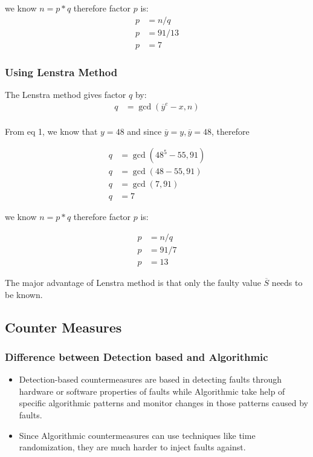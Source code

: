 \documentclass[1p,16pt]{elsarticle}
\begin{document}
we know $n = p * q$ therefore factor $p$ is:
\begin{align}
	p &= n / q \\
	p &= 91 / 13 \\
	p &= 7
\end{align}


\subsubsection{Using Lenstra Method}%
\label{sub:lenstra_method}
The Lenstra method gives factor $q$ by:
\begin{align}
	q &= \gcd(\overline{y}^e - x, n) \\
\end{align}

From eq 1, we know that $y=48$ and since
$\overline{y} = y, \overline{y} = 48$, therefore

\begin{align}
	q &= \gcd(48^5 - 55, 91) \\
	q &= \gcd(48 - 55, 91) \\
	q &= \gcd(7, 91) \\
	q &= 7
\end{align}

we know $n = p * q$ therefore factor $p$ is:

\begin{align}
	p &= n / q \\
	p &= 91 / 7 \\
	p &= 13
\end{align}

The major advantage of Lenstra method is that only the faulty value $\overline{S}$ needs to be known.



\subsection{Counter Measures}%
\label{sub:counter_measures}

\subsubsection{Difference between Detection based and Algorithmic}%
\label{sub:difference_between_detection_based_and_algorithmic}
\begin{itemize}
	\item Detection-based countermeasures are based in detecting faults through hardware or software properties
		of faults while Algorithmic take help of specific algorithmic patterns and monitor changes in those
		patterns caused by faults.
	\item Since Algorithmic countermeasures can use techniques like time randomization, they are much harder
		to inject faults against.
\end{itemize}
\end{document}
